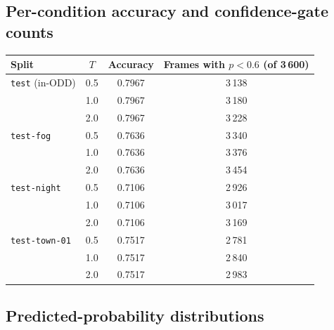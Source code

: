 \documentclass[a4paper,12pt]{article}
\begin{document}
\subsection{Per-condition accuracy and confidence-gate counts}

\begin{center}
\small
\begin{tabular}{@{}lccc@{}}
\toprule
\textbf{Split} & \textbf{$T$} & \textbf{Accuracy} & \textbf{Frames with $p<0.6$ (of 3\,600)} \\
\midrule
\texttt{test} (in-ODD)  & 0.5 & 0.7967 & 3\,138 \\
                        & 1.0 & 0.7967 & 3\,180 \\
                        & 2.0 & 0.7967 & 3\,228 \\
\midrule
\texttt{test-fog}       & 0.5 & 0.7636 & 3\,340 \\
                        & 1.0 & 0.7636 & 3\,376 \\
                        & 2.0 & 0.7636 & 3\,454 \\
\midrule
\texttt{test-night}     & 0.5 & 0.7106 & 2\,926 \\
                        & 1.0 & 0.7106 & 3\,017 \\
                        & 2.0 & 0.7106 & 3\,169 \\
\midrule
\texttt{test-town-01}   & 0.5 & 0.7517 & 2\,781 \\
                        & 1.0 & 0.7517 & 2\,840 \\
                        & 2.0 & 0.7517 & 2\,983 \\
\bottomrule
\end{tabular}
\label{tab:tempcond}
\end{center}

\subsection{Predicted-probability distributions}
\end{document}

